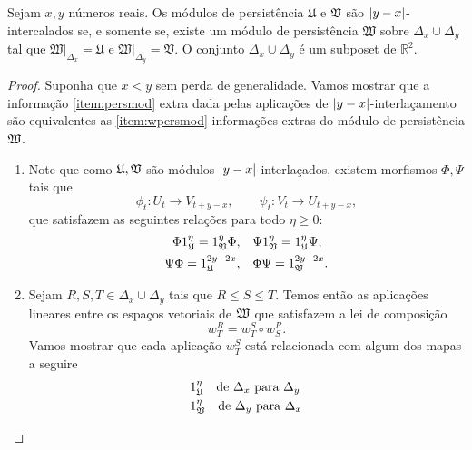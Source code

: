 \begin{propo}\label{teo:prop_inter}
Sejam $x,y$ números reais. Os módulos de persistência $\mathfrak{U}$ 
e $\mathfrak{V}$ são $\left\lvert y-x\right\rvert$-intercalados se, e somente se, existe 
um módulo de persistência $\mathfrak{W}$ sobre $\Delta_x \cup
\Delta_y$ tal que $\left.\mathfrak{W}\right|_{\Delta_x} = 
\mathfrak{U}$ e  $\left.\mathfrak{W}\right|_{\Delta_y} = 
\mathfrak{V}$. O conjunto $\Delta_x \cup \Delta_y$ é um subposet
de $\mathbb{R}^2$.  
\end{propo}
\begin{proof}
Suponha que $x < y$ sem perda de generalidade. Vamos mostrar que a informação
\ref{item:persmod} extra dada pelas aplicações de $\left\lvert y-x\right\rvert$-interlaçamento
são equivalentes
as \ref{item:wpersmod} informações extras do módulo de persistência $\mathfrak{W}$. 
\begin{enumerate}
    \item \label{item:persmod} Note que como $\mathfrak{U}, \mathfrak{V}$ são módulos 
    $\left\lvert y-x\right\rvert$-interlaçados, existem morfismos $\Phi, \Psi$ tais que 
    \begin{equation*}
        \phi_t \colon U_t \to V_{t+y-x}, \qquad \psi_t \colon V_t \to U_{t+y-x},
    \end{equation*}
    que satisfazem as seguintes relações para todo $\eta \geq 0$:
    \begin{equation}\label{eq:rel_uv}
        \begin{split}
        \Phi 1^\eta_{\mathfrak{U}} = 1^\eta_{\mathfrak{V}} \Phi, & \quad \Psi 1^\eta_{\mathfrak{V}} = 1^\eta_{\mathfrak{U}} \Psi, \\
        \Psi \Phi = 1^{2y-2x}_{\mathfrak{U}}, & \quad \Phi \Psi = 1^{2y-2x}_{\mathfrak{V}}.
        \end{split}
    \end{equation}
    \item \label{item:wpersmod} Sejam $R,S,T \in \Delta_x \cup \Delta_y$ tais que $R \leq 
    S \leq T$. Temos então as aplicações lineares entre os espaços vetoriais de $\mathfrak{W}$ 
    que satisfazem a lei de composição
    \begin{equation*}
        w^R_T = w^S_T \circ w^R_S.
    \end{equation*}
    Vamos mostrar que cada aplicação $w^S_T$ está relacionada com algum dos mapas a seguire
    \begin{align*}
        & 1^\eta_\fraku \quad \text{de } \Delta_x \text{ para } \Delta_y \\
        & 1^\eta_\frakv \quad \text{de } \Delta_y \text{ para } \Delta_x \\

\end{align*}
\end{enumerate}
\end{proof}
